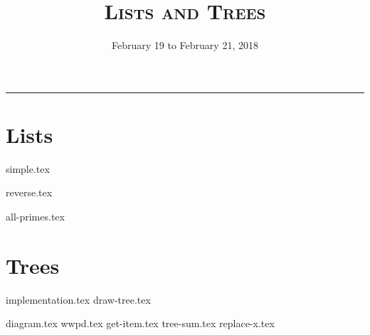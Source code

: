 \documentclass{exam}
\title{\textsc{Lists and Trees}}
\date{February 19 to February 21, 2018}
\begin{document}
\maketitle
\rule{\textwidth}{0.15em}
\fontsize{12}{15}\selectfont


\section{Lists}
\begin{questions}
{simple.tex}

\begin{blocksection}
{reverse.tex}
\end{blocksection}

\newpage
\begin{blocksection}
{all-primes.tex}
\end{blocksection}
\end{questions}

\newpage
\section{Trees}
{implementation.tex}
\vspace{2\baselineskip}
{draw-tree.tex}
\newpage
\begin{questions}
{diagram.tex}
{wwpd.tex}
\vspace{2\baselineskip}
{get-item.tex}
{tree-sum.tex}
\newpage
{replace-x.tex}

\end{questions}
\end{document}
